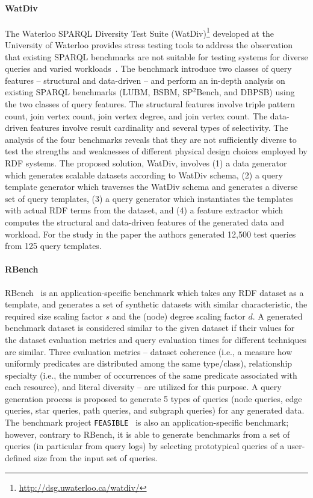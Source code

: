 \paragraph{WatDiv} The Waterloo SPARQL Diversity Test Suite (WatDiv)\footnote{\url{http://dsg.uwaterloo.ca/watdiv/}} developed at the University of Waterloo provides stress testing tools to address the observation that existing SPARQL benchmarks are not suitable for testing systems for diverse queries and varied workloads~\cite{Aluc:2014:DST:2717213.2717229}. The benchmark introduce two classes of query features -- structural and data-driven -- and perform an in-depth analysis on existing SPARQL benchmarks (LUBM, BSBM, SP$^2$Bench, and DBPSB) using the two classes of query features. The structural features involve triple pattern count, join vertex count, join vertex degree, and join vertex count. The data-driven features involve result cardinality and several types of selectivity. The analysis of the four benchmarks reveals that they are not sufficiently diverse to test the strengths and weaknesses of different physical design choices employed by RDF systems. The proposed solution, WatDiv, involves (1) a data generator which generates scalable datasets according to WatDiv schema, (2) a query template generator which traverses the WatDiv schema and generates a diverse set of query templates, (3) a query generator which instantiates the templates with actual RDF terms from the dataset, and (4) a feature extractor which computes the structural and data-driven features of the generated data and workload. For the study in the paper the authors generated 12,500 test queries from 125 query templates.

\paragraph{RBench} RBench~\cite{Qiao:2015:RAR:2723372.2746479} is an application-specific benchmark which takes any RDF dataset as a template, and generates a set of synthetic datasets with similar characteristic, the required size scaling factor $s$ and the (node) degree scaling factor $d$. A generated benchmark dataset is considered similar to the given dataset if their values for the dataset evaluation metrics and query evaluation times for different techniques are similar. Three evaluation metrics -- dataset coherence (i.e., a measure how uniformly predicates are distributed among the same type/class), relationship specialty (i.e., the number of occurrences of the same predicate associated with each resource), and literal diversity -- are utilized for this purpose. A query generation process is proposed to generate 5 types of queries (node queries, edge queries, star queries, path queries, and subgraph queries) for any generated data. The benchmark project \texttt{FEASIBLE}~\cite{Saleem2015} is also an application-specific benchmark; however, contrary to RBench, it is able to generate benchmarks from a set of queries (in particular from query logs) by selecting prototypical queries of a user-defined
size from the input set of queries.


